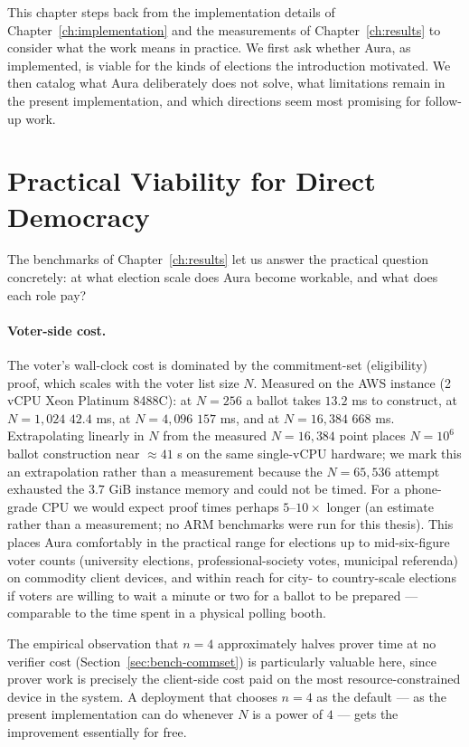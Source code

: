 \documentclass[12pt,a4paper,oneside]{report}
\begin{document}
This chapter steps back from the implementation details of 
Chapter~\ref{ch:implementation} and the measurements of 
Chapter~\ref{ch:results} to consider what the work means in practice. 
We first ask whether Aura, as implemented, is viable for the kinds of 
elections the introduction motivated. We then catalog what Aura 
deliberately does not solve, what limitations remain in the present 
implementation, and which directions seem most promising for follow-up 
work.

\section{Practical Viability for Direct Democracy}
\label{sec:viability}

The benchmarks of Chapter~\ref{ch:results} let us answer the practical 
question concretely: at what election scale does Aura become workable, 
and what does each role pay?

\paragraph{Voter-side cost.}
The voter's wall-clock cost is dominated by the commitment-set
(eligibility) proof, which scales with the voter list size $N$.
Measured on the AWS instance (2 vCPU Xeon Platinum 8488C): at
$N = 256$ a ballot takes $13.2$ ms to construct, at $N = 1{,}024$
$42.4$ ms, at $N = 4{,}096$ $157$ ms, and at $N = 16{,}384$
$668$ ms. Extrapolating linearly in $N$ from the measured
$N = 16{,}384$ point places $N = 10^6$ ballot construction near
$\approx 41$ s on the same single-vCPU hardware; we mark this an
extrapolation rather than a measurement because the $N = 65{,}536$
attempt exhausted the $3.7$ GiB instance memory and could not be
timed. For a phone-grade CPU we would expect proof times perhaps
$5$--$10\times$ longer (an estimate rather than a measurement; no
ARM benchmarks were run for this thesis). This places Aura
comfortably in the practical range for elections up to mid-six-figure
voter counts (university elections, professional-society votes,
municipal referenda) on commodity client devices, and within reach
for city- to country-scale elections if voters are willing to wait
a minute or two for a ballot to be prepared --- comparable to the
time spent in a physical polling booth.

The empirical observation that $n = 4$ approximately halves prover 
time at no verifier cost (Section~\ref{sec:bench-commset}) is 
particularly valuable here, since prover work is precisely the 
client-side cost paid on the most resource-constrained device in the 
system. A deployment that chooses $n = 4$ as the default --- as the 
present implementation can do whenever $N$ is a power of $4$ --- 
gets the improvement essentially for free.
\end{document}
